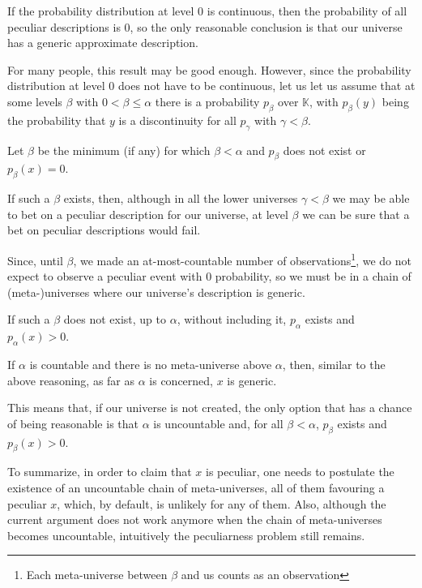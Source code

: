 \documentclass[a4paper
,draft
]{article}
\newcommand{\svn}[2][]{\todo[author=Virgil,color=red!25!white,#1]{#2}}
\def\descriptions{\mathbb{K}}
\begin{document}
If the probability distribution at level $0$ is continuous,
then the probability of all peculiar descriptions is $0$,
so the only reasonable conclusion is that our universe has a generic
approximate description.

For many people, this result may be good enough. However, since the
probability distribution at level $0$ does not have to be continuous,
let us let us assume that at some levels $\beta$ with
$0 < \beta \le \alpha$ there is a probability
$p_\beta$ over $\descriptions$, with $p_\beta(y)$ being
the probability that $y$ is a discontinuity
for all $p_\gamma$ with $\gamma < \beta$.

Let $\beta$ be the minimum (if any) for which $\beta < \alpha$ and
$p_\beta$ does not exist or $p_\beta(x) = 0$.


If such a $\beta$ exists, then, although in all the lower universes
$\gamma < \beta$ we may be able to bet on a peculiar description for our
universe, at level $\beta$ we can be sure that a bet on peculiar descriptions
would fail.

Since, until $\beta$, we made an at-most-countable number of
observations\footnote{Each meta-universe between $\beta$ and us counts as an
observation}, we
do not expect to observe a peculiar event with $0$ probability, so we must be
in a chain of (meta-)universes where our universe's description is
generic.

If such a $\beta$ does not exist, up to $\alpha$, without including it,
$p_\alpha$ exists and $p_\alpha(x) > 0$.

If $\alpha$ is countable and there is no meta-universe above $\alpha$,
then, similar to the above reasoning, as far as $\alpha$ is concerned,
$x$ is generic.

This means that, if our universe is not created, the only option that
has a chance of being reasonable is that $\alpha$ is uncountable and,
for all $\beta < \alpha$, $p_\beta$ exists and $p_\beta(x) > 0$.

To summarize, in order to claim that $x$ is peculiar, one needs to postulate the
existence of an uncountable chain of meta-universes, all of them favouring a
peculiar $x$, which, by default, is unlikely for any of them. Also, although the
current argument does not work anymore when the chain of
meta-universes becomes uncountable, intuitively the peculiarness problem
still remains.
\end{document}
